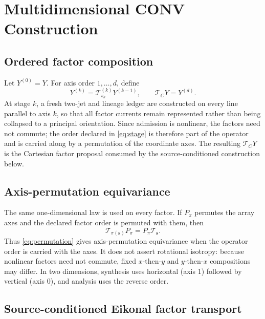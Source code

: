 \documentclass[journal]{IEEEtran}
\newcommand{\Tcal}{\mathcal{T}}
\begin{document}
\section{Multidimensional CONV Construction}

\subsection{Ordered factor composition}

Let \(Y^{(0)}=Y\). For axis order \(1,\ldots,d\), define
\begin{equation}
 Y^{(k)}=\Tcal_{s_k}^{(k)}Y^{(k-1)},\qquad
 \Tcal_CY=Y^{(d)}.
 \label{eq:stage}
\end{equation}
At stage \(k\), a fresh two-jet and lineage ledger are constructed on every
line parallel to axis \(k\), so that all factor currents remain represented
rather than being collapsed to a principal orientation. Since admission is
nonlinear, the factors need not commute; the order declared in
\eqref{eq:stage} is therefore part of the operator and is carried along by a
permutation of the coordinate axes. The resulting \(\Tcal_CY\) is the
Cartesian factor proposal consumed by the source-conditioned construction
below.

\subsection{Axis-permutation equivariance}

The same one-dimensional law is used on every factor. If \(P_\pi\) permutes
the array axes and the declared factor order is permuted with them, then
\begin{equation}
 \Tcal_{\pi(\bm s)}P_\pi=P_\pi\Tcal_{\bm s}.
 \label{eq:permutation}
\end{equation}
Thus \eqref{eq:permutation} gives axis-permutation equivariance when the
operator order is carried with the axes. It does not assert rotational
isotropy: because nonlinear factors need not commute, fixed
\(x\)-then-\(y\) and \(y\)-then-\(x\) compositions may differ. In two
dimensions, synthesis uses horizontal (axis 1) followed by vertical (axis
0), and analysis uses the reverse order.

\subsection{Source-conditioned Eikonal factor transport}
\label{sec:witnessedtransport}
\end{document}
